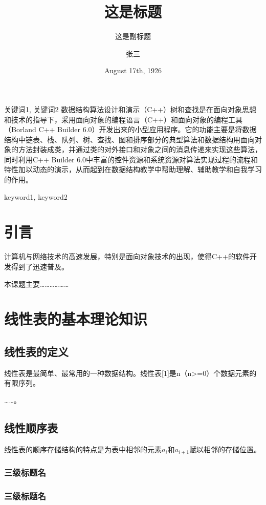 \documentclass{upcthesis}
\title{这是标题}
\author{张三}
\date{August 17th, 1926}
\subtitle{这是副标题}
\begin{document}
	\maketitle
	\begin{cnabstract}{关键词1, 关键词2}
		数据结构算法设计和演示（C++）树和查找是在面向对象思想和技术的指导下，采用面向对象的编程语言（C++）和面向对象的编程工具（Borland C++ Builder 6.0）开发出来的小型应用程序。它的功能主要是将数据结构中链表、栈、队列、树、查找、图和排序部分的典型算法和数据结构用面向对象的方法封装成类，并通过类的对外接口和对象之间的消息传递来实现这些算法，同时利用C++ Builder 6.0中丰富的控件资源和系统资源对算法实现过程的流程和特性加以动态的演示，从而起到在数据结构教学中帮助理解、辅助教学和自我学习的作用。
	\end{cnabstract}

	\begin{enabstract}{keyword1, keyword2}
		\lipsum[1]
	\end{enabstract}

\tableofcontents

	\section{引言}
		计算机与网络技术的高速发展，特别是面向对象技术的出现，使得C++的软件开发得到了迅速普及。
		
		本课题主要………………
\section{线性表的基本理论知识}

\subsection{线性表的定义}
线性表是最简单、最常用的一种数据结构。线性表[1]是n（n>=0）个数据元素的有限序列。

……。
\subsection{线性顺序表}
线性表的顺序存储结构的特点是为表中相邻的元素$a_i$和$a_{i+1}$赋以相邻的存储位置。
\subsubsection{三级标题名}
\lipsum[2]
\subsubsection{三级标题名}
\lipsum[3]
	\lipsum[4]
\end{document}

